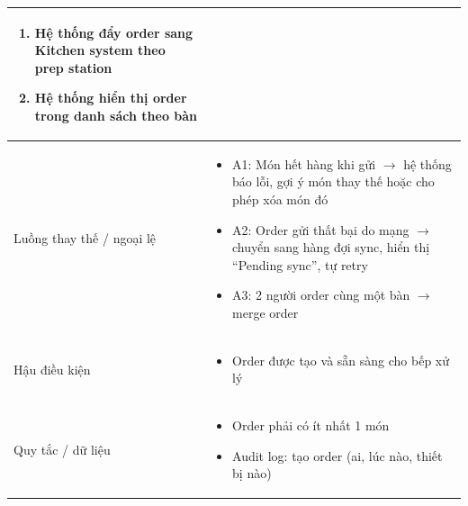 \begin{longtable}{|>{\raggedright\arraybackslash}p{}|>{\raggedright\arraybackslash}p{}|}
\begin{enumerate}[leftmargin=*]
\item Hệ thống đẩy order sang Kitchen system theo prep station
\item Hệ thống hiển thị order trong danh sách theo bàn
\end{enumerate}
\vspace{-0.5em}
\\
\hline
Luồng thay thế / ngoại lệ &
\vspace{-0.5em}
\begin{itemize}[leftmargin=*]
\item A1: Món hết hàng khi gửi $\rightarrow$ hệ thống báo lỗi, gợi ý món thay thế hoặc cho phép xóa món đó
\item A2: Order gửi thất bại do mạng $\rightarrow$ chuyển sang hàng đợi sync, hiển thị “Pending sync”, tự retry
\item A3: 2 người order cùng một bàn $\rightarrow$ merge order
\end{itemize}
\vspace{-0.5em}
\\
\hline
Hậu điều kiện &
\vspace{-0.5em}
\begin{itemize}[leftmargin=*]
\item Order được tạo và sẵn sàng cho bếp xử lý
\end{itemize}
\vspace{-0.5em}
\\
\hline
Quy tắc / dữ liệu &
\vspace{-0.5em}
\begin{itemize}[leftmargin=*]
\item Order phải có ít nhất 1 món
\item Audit log: tạo order (ai, lúc nào, thiết bị nào)
\end{itemize}
\vspace{-0.5em}
\\
\hline
\end{longtable}

